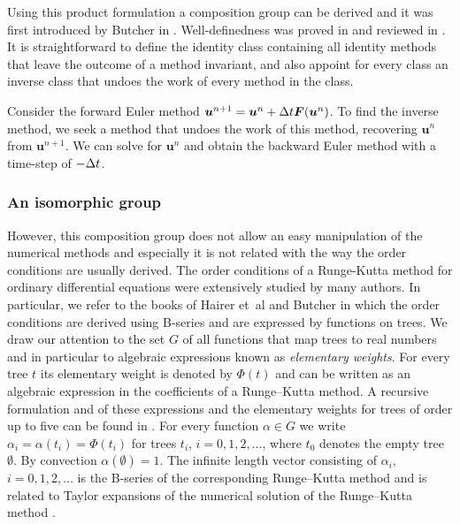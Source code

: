 Using this product formulation a composition group can be derived and it was first introduced by Butcher in \cite{Butcher1969}. Well-definedness was proved in \cite{Butcher1972} and reviewed in \cite{Butcher1987_book, Butcher2008_book}. It is straightforward to define the identity class containing all identity methods that leave the outcome of a method invariant, and also appoint for every class an inverse class that undoes the work of every method in the class.

\begin{example}\label{ex:FE_inv_1}
	Consider the forward Euler method $\bm{u}^{n+1} = \bm{u}^{n} + \Delta t \bm{F}(\bm{u}^{n})$. To find the inverse method, we 		
	seek a method that undoes the work of this method, recovering $\bm{u}^{n}$ from $\bm{u}^{n+1}$. We can solve for 
	$\bm{u}^{n}$ and obtain the backward Euler method with a time-step of $-\Delta t$.
\end{example}

\subsubsection{An isomorphic group}

\indent However, this composition group does not allow an easy manipulation of the numerical methods and especially it is not related with the way the order conditions are usually derived. The order conditions of a Runge-Kutta method for ordinary differential equations were extensively studied by many authors. In particular, we refer to the books of Hairer et~al \cite{Hairer1989_book, Hairer1987_book} and Butcher \cite{Butcher2008_book} in which the order conditions are derived using B-series and are expressed by functions on trees. We draw our attention to the set $G$ of all functions that map trees to real numbers and in particular to algebraic expressions known as \emph{elementary weights}. For every tree $t$ its elementary weight is denoted by $\Phi(t)$ and  can be written as an algebraic expression in the coefficients of a Runge--Kutta method.  A recursive formulation and of these expressions and the elementary weights for trees of order up to five can be found in \cite[Definition and Tables~3.12]{Butcher2008_book}.  For every function $\alpha \in G$ we write $\alpha_{i} = \alpha(t_{i}) = \Phi(t_{i})$ for trees $t_{i}$, $i = 0, 1, 2, \dots$, where $t_{0}$ denotes the empty tree $\emptyset$. By convection $\alpha(\emptyset) = 1$. The infinite length vector consisting of $\alpha_i$, $i = 0, 1, 2, \ldots$ is the B-series of the corresponding Runge--Kutta method and is related to Taylor expansions of the numerical solution of the Runge--Kutta method \cite{Hairer1974, Butcher2008_book}.

